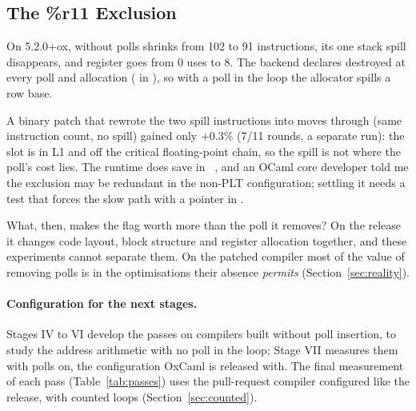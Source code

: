 \subsection{The \texorpdfstring{\%r11}{r11} Exclusion}
\label{sec:r11}
On 5.2.0+ox, without polls  shrinks from 102 to 91 instructions, its one
stack spill disappears, and register  goes from 0 uses to 8. The
backend declares  destroyed at every poll and allocation
( in ), so with a
poll in the loop the allocator spills a row base.

A binary patch that rewrote the two spill instructions into moves through
 (same instruction count, no spill) gained only $+0.3\%$ (7/11
rounds, a separate run): the slot is in L1 and off the critical floating-point
chain, so the spill is not where the poll's cost lies. The runtime does save
 in ~\cite{ocaml_runtime}, and an OCaml core
developer told me the exclusion may be redundant in the non-PLT
configuration; settling it needs a test that forces the slow path with a
pointer in .

What, then, makes the flag worth more than the poll it removes? On the
release it changes code layout, block structure and register allocation
together, and these experiments cannot separate them. On the patched compiler
most of the value of removing polls is in the optimisations their absence
\emph{permits} (Section~\ref{sec:reality}).

\paragraph{Configuration for the next stages.} Stages IV to VI develop the
passes on compilers built without poll insertion, to study the address
arithmetic with no poll in the loop; Stage VII measures them with polls on,
the configuration OxCaml is released with. The final measurement of each pass
(Table~\ref{tab:passes}) uses the pull-request compiler configured like the
release, with counted loops (Section~\ref{sec:counted}).
